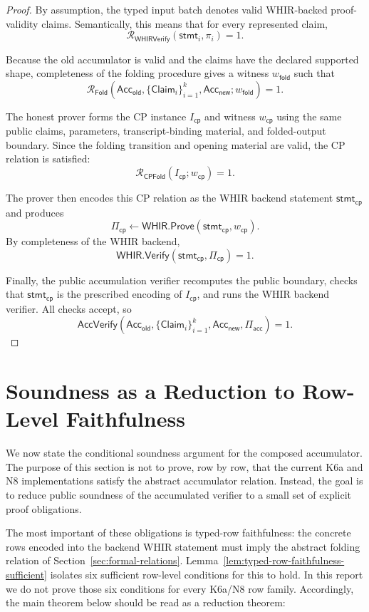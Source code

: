 \documentclass[11pt]{article}
\theoremstyle{definition}
\newcommand{\WHIR}{\mathsf{WHIR}}
\newcommand{\Acc}{\mathsf{Acc}}
\newcommand{\Verify}{\mathsf{Verify}}
\newcommand{\Prove}{\mathsf{Prove}}
\newcommand{\Rwhir}{\mathcal{R}_{\mathsf{WHIRVerify}}}
\newcommand{\Rfold}{\mathcal{R}_{\mathsf{Fold}}}
\newcommand{\Rcp}{\mathcal{R}_{\mathsf{CPFold}}}
\begin{document}
\begin{proof}
By assumption, the typed input batch denotes valid WHIR-backed proof-validity
claims. Semantically, this means that for every represented claim,
\[
  \Rwhir(\mathsf{stmt}_i,\pi_i)=1.
\]

Because the old accumulator is valid and the claims have the declared supported
shape, completeness of the folding procedure gives a witness
$w_{\mathsf{fold}}$ such that
\[
  \Rfold\!\left(
    \Acc_{\mathsf{old}},
    \{\mathsf{Claim}_i\}_{i=1}^k,
    \Acc_{\mathsf{new}};
    w_{\mathsf{fold}}
  \right)=1.
\]

The honest prover forms the CP instance $I_{\mathsf{cp}}$ and witness
$w_{\mathsf{cp}}$ using the same public claims, parameters, transcript-binding
material, and folded-output boundary. Since the folding transition and opening
material are valid, the CP relation is satisfied:
\[
  \Rcp(I_{\mathsf{cp}};w_{\mathsf{cp}})=1.
\]

The prover then encodes this CP relation as the WHIR backend statement
$\mathsf{stmt}_{\mathsf{cp}}$ and produces
\[
  \Pi_{\mathsf{cp}}
  \leftarrow
  \WHIR.\Prove(\mathsf{stmt}_{\mathsf{cp}},w_{\mathsf{cp}}).
\]
By completeness of the WHIR backend,
\[
  \WHIR.\Verify(\mathsf{stmt}_{\mathsf{cp}},\Pi_{\mathsf{cp}})=1.
\]

Finally, the public accumulation verifier recomputes the public boundary,
checks that $\mathsf{stmt}_{\mathsf{cp}}$ is the prescribed encoding of
$I_{\mathsf{cp}}$, and runs the WHIR backend verifier. All checks accept, so
\[
  \mathsf{AccVerify}
  \left(
    \Acc_{\mathsf{old}},
    \{\mathsf{Claim}_i\}_{i=1}^k,
    \Acc_{\mathsf{new}},
    \Pi_{\mathsf{acc}}
  \right)=1.
\]
\end{proof}
\section{Soundness as a Reduction to Row-Level Faithfulness}
\label{sec:soundness}

We now state the conditional soundness argument for the composed accumulator.
The purpose of this section is not to prove, row by row, that the current K6a
and N8 implementations satisfy the abstract accumulator relation. Instead, the
goal is to reduce public soundness of the accumulated verifier to a small set of
explicit proof obligations.

The most important of these obligations is typed-row faithfulness: the concrete
rows encoded into the backend WHIR statement must imply the abstract folding
relation of Section~\ref{sec:formal-relations}. Lemma~\ref{lem:typed-row-faithfulness-sufficient}
isolates six sufficient row-level conditions for this to hold. In this report we
do not prove those six conditions for every K6a/N8 row family. Accordingly, the
main theorem below should be read as a reduction theorem:
\end{document}
